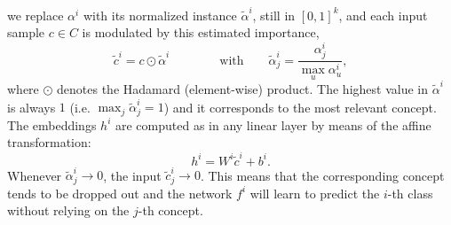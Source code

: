 \documentclass[withindex,glossary]{cam-thesis}
\theoremstyle{plain}
\theoremstyle{definition}
\theoremstyle{remark}
\begin{document}
we replace $\alpha^i$ with its normalized instance $\tilde{\alpha}^i$, still  in $[0,1]^k$,
and each input sample %
$c \in C$ is modulated by this %
estimated importance, %
\begin{equation} \label{eq:drop}
    \tilde{c}^i = c \odot \tilde{\alpha}^i \qquad\qquad \text{with} \qquad \tilde{\alpha}_j^i = \frac{\alpha_j^i}{\max_u \alpha_u^i},
\end{equation}
where $\odot$ denotes the Hadamard (element-wise) product.
The highest value in $\tilde{\alpha}^i$ is always $1$ (i.e. $\max_j \tilde{\alpha}_j^i = 1$) and it corresponds to the most relevant concept. 
The embeddings $h^i$ are computed as in any linear layer by means of the affine transformation:
\begin{equation} \label{eq:forward}
    h^i = W^i \tilde{c}^i + b^i.
\end{equation}
Whenever $\tilde{\alpha}_j^i \rightarrow 0$, the input $\tilde{c}_j^i \rightarrow 0$.
This means that the corresponding concept tends to be dropped out and the network $f^i$ will learn to predict the $i$-th class without 
relying on %
the $j$-th concept. 
\end{document}
